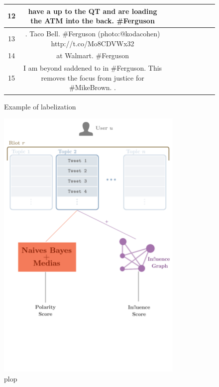 \documentclass[a4paper,12pt]{report}
\newcommand{\nl}{\tabularnewline\midrule}
\begin{document}
\begin{figure}[h!]
\begin{tabular}{c|Cp{3cm}}
12 &  have  a  up to the QT and are loading the ATM into the back. \#Ferguson &  \newline {} \nl
13 & . Taco Bell. \#Ferguson (photo:@kodacohen) http://t.co/Mo8CDVWx32 &  \newline {} \nl
14 &   at Walmart. \#Ferguson &  \newline {} \nl
15 & I am beyond saddened to  in \#Ferguson. This removes the focus from justice for \#MikeBrown. . &  \newline {} \nl
\end{tabular}
\label{tabtypes}
\caption{Example of labelization}
\end{figure}

\newpage 

\begin{figure}[h]
\centering
\includegraphics[width=0.8\textwidth]{images/diags/chain.png}
\caption{plop}
\end{figure}
\end{document}
